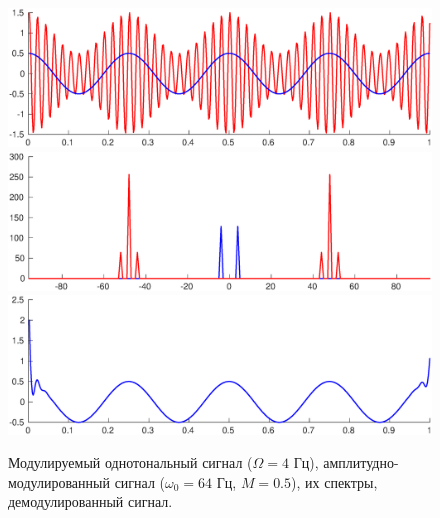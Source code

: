 \documentclass[a4paper,14pt]{extarticle}
\begin{document}
\begin{figure}[p]
\centering
\includegraphics[width=1\textwidth]{ammod_m05.eps}
\includegraphics[width=1\textwidth]{ammod_s_m05.eps}
\includegraphics[width=1\textwidth]{amdemod_m_05.eps}
\captionsetup{justification=centering,margin=0.5cm}
\caption{Модулируемый однотональный сигнал ($\Omega = 4$ Гц), амплитудно-модулированный сигнал ($\omega_0 = 64$ Гц, $M = 0.5$), их спектры, демодулированный сигнал.}
\label{am2}
\end{figure}
\end{document}
